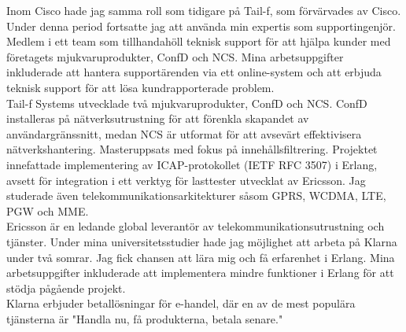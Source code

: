 \documentclass[purpleprocv]{procv}
\begin{document}
\begin{procv-twocolumns}
{          
          {Inom Cisco hade jag samma roll som tidigare på Tail-f, som förvärvades av Cisco. 
          Under denna period fortsatte jag att använda min expertis som supportingenjör.}
          {Medlem i ett team som tillhandahöll teknisk support för att hjälpa kunder med företagets 
          mjukvaruprodukter, ConfD och NCS. Mina arbetsuppgifter inkluderade att hantera 
          supportärenden via ett online-system och att erbjuda teknisk support för 
          att lösa kundrapporterade problem.
          \\[3pt]
          Tail-f Systems utvecklade två mjukvaruprodukter, ConfD och NCS. ConfD installeras 
          på nätverksutrustning för att förenkla skapandet av användargränssnitt, medan NCS är 
          utformat för att avsevärt effektivisera nätverkshantering.}
          {Masteruppsats med fokus på innehållsfiltrering. Projektet innefattade implementering 
          av ICAP-protokollet (IETF RFC 3507) i Erlang, avsett för integration i ett 
          verktyg för lasttester utvecklat av Ericsson. Jag studerade även 
          telekommunikationsarkitekturer såsom GPRS, WCDMA, LTE, PGW och MME.
          \\[3pt]
          Ericsson är en ledande global leverantör av telekommunikationsutrustning och tjänster.}
          {Under mina universitetsstudier hade jag möjlighet att arbeta på Klarna under två 
          somrar. Jag fick chansen att lära mig och få erfarenhet i Erlang. Mina 
          arbetsuppgifter inkluderade att implementera mindre funktioner i Erlang för att 
          stödja pågående projekt. 
          \\[3pt]
          Klarna erbjuder betallösningar för e-handel, där en av de mest populära tjänsterna 
          är "Handla nu, få produkterna, betala senare."}
        }
\end{procv-twocolumns}
\end{document}
